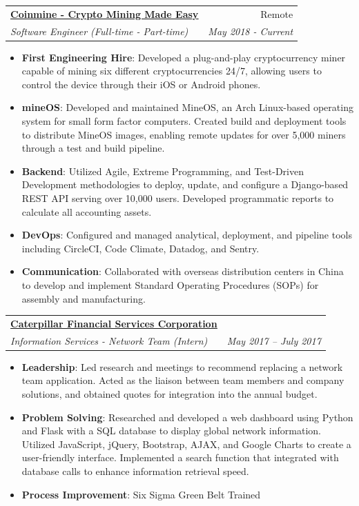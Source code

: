 \documentclass[a4paper,20pt]{article}
\makeatletter
\newcommand{\resumeItem}[2]{
  \item\small{
    \textbf{#1}{: #2 \vspace{-2pt}}
  }
}
\newcommand{\resumeSubheading}[4]{
  \vspace{-1pt}\item
    \begin{tabular*}{0.97\textwidth}{l@{\extracolsep{\fill}}r}
      \textbf{#1} & #2 \\
      \textit{#3} & \textit{#4} \\
    \end{tabular*}\vspace{-5pt}
}
\newcommand{\resumeItemListStart}{\begin{itemize}}
\newcommand{\resumeItemListEnd}{\end{itemize}\vspace{-5pt}}
\makeatother
\begin{document}
    \resumeSubheading
    {\underline{\href{http://coinmine.com}{Coinmine - Crypto Mining Made Easy}}}{Remote}
		{Software Engineer (Full-time - Part-time)}{May 2018 - Current}
		\resumeItemListStart
        \resumeItem{First Engineering Hire}
        {Developed a plug-and-play cryptocurrency miner capable of mining six different cryptocurrencies 24/7, allowing users to control the device through their iOS or Android phones.}
        \resumeItem{mineOS}
        {Developed and maintained MineOS, an Arch Linux-based operating system for small form factor computers. Created build and deployment tools to distribute MineOS images, enabling remote updates for over 5,000 miners through a test and build pipeline.}
        \resumeItem{Backend}
        {Utilized Agile, Extreme Programming, and Test-Driven Development methodologies to deploy, update, and configure a Django-based REST API serving over 10,000 users. Developed programmatic reports to calculate all accounting assets.}
        \resumeItem{DevOps}
        {Configured and managed analytical, deployment, and pipeline tools including CircleCI, Code Climate, Datadog, and Sentry.}
        \resumeItem{Communication}
        {Collaborated with overseas distribution centers in China to develop and implement Standard Operating Procedures (SOPs) for assembly and manufacturing.}
		\resumeItemListEnd
\vspace{10pt}

    \resumeSubheading
    {\underline{\href{https://www.catfinancial.com/en_US.html/}{Caterpillar Financial Services Corporation}}}{}
		{Information Services - Network Team (Intern)}{May 2017 – July 2017}
		\resumeItemListStart
        \resumeItem{Leadership}
        {Led research and meetings to recommend replacing a network team application. Acted as the liaison between team members and company solutions, and obtained quotes for integration into the annual budget.}
        \resumeItem{Problem Solving}
        {Researched and developed a web dashboard using Python and Flask with a SQL database to display global network information. Utilized JavaScript, jQuery, Bootstrap, AJAX, and Google Charts to create a user-friendly interface. Implemented a search function that integrated with database calls to enhance information retrieval speed.}
         \resumeItem{Process Improvement}{Six Sigma Green Belt Trained}
		\resumeItemListEnd
\end{document}
